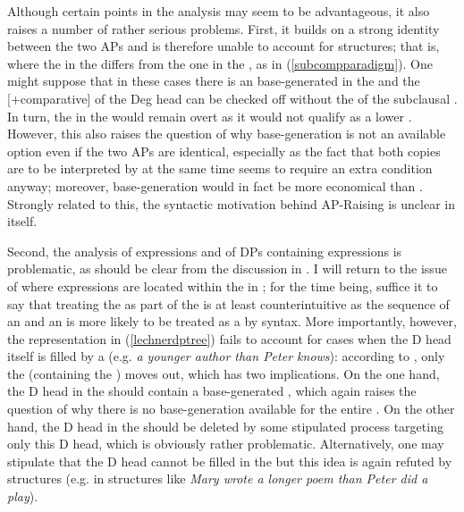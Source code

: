 Although certain points in the analysis may seem to be advantageous, it also raises a number of rather serious problems. First, it builds on a strong identity between the two APs and is therefore unable to account for  structures; that is, where the  in the  differs from the one in the , as in (\ref{subcompparadigm}). One might suppose that in these cases there is an  base-generated in the  and the [+comparative]  of the Deg head can be checked off without the  of the subclausal . In turn, the  in the  would remain overt as it would not qualify as a lower . However, this also raises the question of why base-generation is not an available option even if the two APs are identical, especially as the fact that both copies are to be interpreted by  at the same time seems to require an extra condition anyway; moreover, base-generation would in fact be more economical than . Strongly related to this, the syntactic motivation behind AP-Raising is unclear in itself.

Second, the analysis of  expressions and of DPs containing  expressions is problematic, as should be clear from the discussion in . I will return to the issue of where  expressions are located within the  in ; for the time being, suffice it to say that treating the  as part of the  is at least counterintuitive as the sequence of an  and an  is more likely to be treated as a  by syntax. More importantly, however, the representation in (\ref{lechnerdptree}) fails to account for cases when the D head itself is filled by a  (e.g. \textit{a younger author than Peter knows}): according to \citet{lechner2004}, only the  (containing the ) moves out, which has two implications. On the one hand, the D head in the  should contain a base-generated , which again raises the question of why there is no base-generation available for the entire . On the other hand, the D head in the  should be deleted by some stipulated  process targeting only this D head, which is obviously rather problematic. Alternatively, one may stipulate that the D head cannot be filled in the  but this idea is again refuted by  structures (e.g. in structures like \textit{Mary wrote a longer poem than Peter did a play}).

